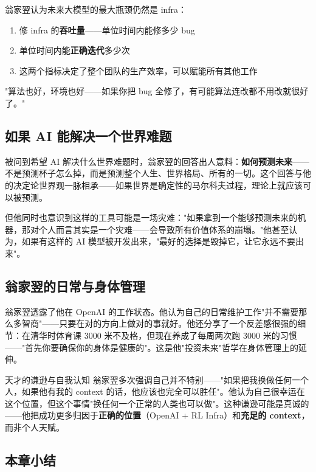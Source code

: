 \documentclass[a4paper]{article}
\begin{document}
翁家翌认为未来大模型的最大瓶颈仍然是 infra：

\begin{enumerate}
    \item 修 infra 的\textbf{吞吐量}——单位时间内能修多少 bug
    \item 单位时间内能\textbf{正确迭代}多少次
    \item 这两个指标决定了整个团队的生产效率，可以赋能所有其他工作
\end{enumerate}

"算法也好，环境也好——如果你把 bug 全修了，有可能算法连改都不用改就很好了。"

\subsection{如果 AI 能解决一个世界难题}

被问到希望 AI 解决什么世界难题时，翁家翌的回答出人意料：\textbf{如何预测未来}——不是预测杯子怎么掉，而是预测整个人生、世界格局、所有的一切。这个回答与他的决定论世界观一脉相承——如果世界是确定性的马尔科夫过程，理论上就应该可以被预测。

但他同时也意识到这样的工具可能是一场灾难："如果拿到一个能够预测未来的机器，那对个人而言其实是一个灾难——会导致所有价值体系的崩塌。"他甚至认为，如果有这样的 AI 模型被开发出来，"最好的选择是毁掉它，让它永远不要出来"。

\subsection{翁家翌的日常与身体管理}

翁家翌透露了他在 OpenAI 的工作状态。他认为自己的日常维护工作"并不需要那么多智商"——只要在对的方向上做对的事就好。他还分享了一个反差感很强的细节：在清华时体育课 3000 米不及格，但现在养成了每周两次跑 3000 米的习惯——"首先你要确保你的身体是健康的"。这是他"投资未来"哲学在身体管理上的延伸。

\begin{warningbox}{天才的谦逊与自我认知}
翁家翌多次强调自己并不特别——"如果把我换做任何一个人，如果他有我的 context 的话，他应该也完全可以胜任"。他认为自己很幸运在这个位置，但这个事情"换任何一个正常的人类也可以做"。这种谦逊可能是真诚的——他把成功更多归因于\textbf{正确的位置}（OpenAI + RL Infra）和\textbf{充足的 context}，而非个人天赋。
\end{warningbox}

\subsection{本章小结}
\end{document}
